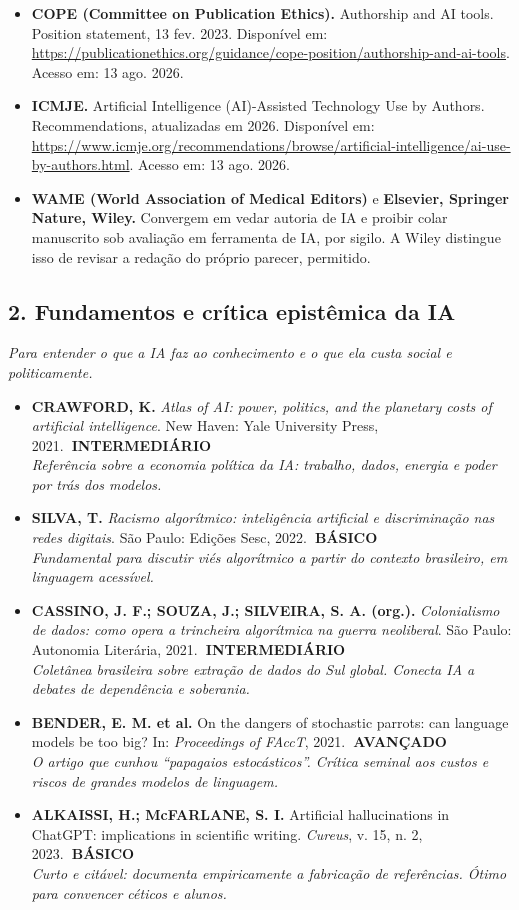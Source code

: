 \documentclass[11pt,a4paper]{article}
\newcommand{\iconBookmark}[1]{%
  \begin{tikzpicture}[baseline=-0.55ex]
    \draw[#1,line width=1pt,line join=round] (-0.11,0.15) -- (0.11,0.15) -- (0.11,-0.15) -- (0,-0.03) -- (-0.11,-0.15) -- cycle;
  \end{tikzpicture}}
\newcommand{\refc}[2]{\item #1\\{\footnotesize\color{cinzaescuro}\textit{#2}}}
\newcommand{\nivelbasico}{\hfill\colorbox{verdeCodigo}{\color{white}\scriptsize\poppinsmed\textbf{~BÁSICO~}}}
\newcommand{\nivelinterm}{\hfill\colorbox{amareloSol}{\color{black}\scriptsize\poppinsmed\textbf{~INTERMEDIÁRIO~}}}
\newcommand{\nivelavancado}{\hfill\colorbox{laranjaDestaque}{\color{white}\scriptsize\poppinsmed\textbf{~AVANÇADO~}}}
\begin{document}
\begin{leitura}[title={\iconBookmark{white}\ \ Normas editoriais internacionais e revisão por pares}]
\begin{itemize}[leftmargin=1.2em,nosep]
\item \textbf{COPE (Committee on Publication Ethics).} Authorship and AI tools. Position statement, 13 fev. 2023. Disponível em: \url{https://publicationethics.org/guidance/cope-position/authorship-and-ai-tools}. Acesso em: 13 ago. 2026.
\item \textbf{ICMJE.} Artificial Intelligence (AI)-Assisted Technology Use by Authors. Recommendations, atualizadas em 2026. Disponível em: \url{https://www.icmje.org/recommendations/browse/artificial-intelligence/ai-use-by-authors.html}. Acesso em: 13 ago. 2026.
\item \textbf{WAME (World Association of Medical Editors)} e \textbf{Elsevier, Springer Nature, Wiley.} Convergem em vedar autoria de IA e proibir colar manuscrito sob avaliação em ferramenta de IA, por sigilo. A Wiley distingue isso de revisar a redação do próprio parecer, permitido.
\end{itemize}
\end{leitura}

\subsection*{2. Fundamentos e crítica epistêmica da IA}
\textit{Para entender o que a IA faz ao conhecimento e o que ela custa social e politicamente.}
\begin{itemize}[leftmargin=1.4em]
\refc{\textbf{CRAWFORD, K.} \textit{Atlas of AI: power, politics, and the planetary costs of artificial intelligence}. New Haven: Yale University Press, 2021.\nivelinterm}{Referência sobre a economia política da IA: trabalho, dados, energia e poder por trás dos modelos.}
\refc{\textbf{SILVA, T.} \textit{Racismo algorítmico: inteligência artificial e discriminação nas redes digitais}. São Paulo: Edições Sesc, 2022.\nivelbasico}{Fundamental para discutir viés algorítmico a partir do contexto brasileiro, em linguagem acessível.}
\refc{\textbf{CASSINO, J. F.; SOUZA, J.; SILVEIRA, S. A. (org.).} \textit{Colonialismo de dados: como opera a trincheira algorítmica na guerra neoliberal}. São Paulo: Autonomia Literária, 2021.\nivelinterm}{Coletânea brasileira sobre extração de dados do Sul global. Conecta IA a debates de dependência e soberania.}
\refc{\textbf{BENDER, E. M. et al.} On the dangers of stochastic parrots: can language models be too big? In: \textit{Proceedings of FAccT}, 2021.\nivelavancado}{O artigo que cunhou ``papagaios estocásticos''. Crítica seminal aos custos e riscos de grandes modelos de linguagem.}
\refc{\textbf{ALKAISSI, H.; McFARLANE, S. I.} Artificial hallucinations in ChatGPT: implications in scientific writing. \textit{Cureus}, v. 15, n. 2, 2023.\nivelbasico}{Curto e citável: documenta empiricamente a fabricação de referências. Ótimo para convencer céticos e alunos.}
\end{itemize}
\end{document}
